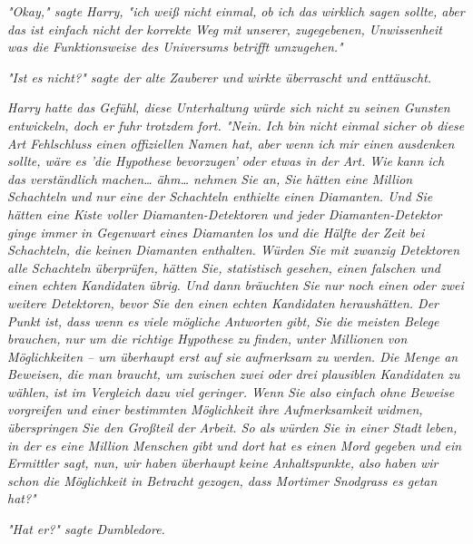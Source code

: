{\emph{"Okay," sagte Harry, "ich weiß nicht einmal, ob ich das wirklich sagen sollte, aber das ist einfach nicht der korrekte Weg mit unserer, zugegebenen, Unwissenheit was die Funktionsweise des Universums betrifft umzugehen."}

\emph{"Ist es nicht?" sagte der alte Zauberer und wirkte überrascht und enttäuscht.}

\emph{Harry hatte das Gefühl, diese Unterhaltung würde sich nicht zu seinen Gunsten entwickeln, doch er fuhr trotzdem fort. "Nein. Ich bin nicht einmal sicher ob diese Art Fehlschluss einen offiziellen Namen hat, aber wenn ich mir einen ausdenken sollte, wäre es 'die Hypothese bevorzugen' oder etwas in der Art. Wie kann ich das verständlich machen… ähm… nehmen Sie an, Sie hätten eine Million Schachteln und nur eine der Schachteln enthielte einen Diamanten. Und Sie hätten eine Kiste voller Diamanten-Detektoren und jeder Diamanten-Detektor ginge immer in Gegenwart eines Diamanten los und die Hälfte der Zeit bei Schachteln, die keinen Diamanten enthalten. Würden Sie mit zwanzig Detektoren alle Schachteln überprüfen, hätten Sie, statistisch gesehen, einen falschen und einen echten Kandidaten übrig. Und dann bräuchten Sie nur noch einen oder zwei weitere Detektoren, bevor Sie den einen echten Kandidaten heraushätten. Der Punkt ist, dass wenn es viele mögliche Antworten gibt, Sie die meisten Belege brauchen, nur um die richtige Hypothese zu} \emph{\emph{finden,}} \emph{unter Millionen von Möglichkeiten -- um überhaupt erst auf sie aufmerksam zu werden. Die Menge an Beweisen, die man braucht, um zwischen zwei oder drei plausiblen Kandidaten zu wählen, ist im Vergleich dazu viel geringer. Wenn Sie also einfach ohne Beweise vorgreifen und einer bestimmten Möglichkeit ihre Aufmerksamkeit widmen, überspringen Sie den Großteil der Arbeit. So als würden Sie in einer Stadt leben, in der} \emph{es eine Million Menschen gibt und dort hat es einen Mord gegeben und ein Ermittler sagt, nun, wir haben überhaupt keine Anhaltspunkte, also haben wir schon die Möglichkeit in Betracht gezogen, dass Mortimer Snodgrass es getan hat?"}

\emph{"Hat er?" sagte Dumbledore.}

}
